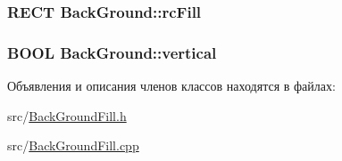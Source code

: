 \hypertarget{class_back_ground_ab617902b70204abeba1512a5a85c3114}{
\subsubsection[{rc\-Fill}]{\setlength{\rightskip}{0pt plus 5cm}R\-E\-C\-T Back\-Ground\-::rc\-Fill\hspace{0.3cm}{\ttfamily [protected]}}}\label{class_back_ground_ab617902b70204abeba1512a5a85c3114}
\hypertarget{class_back_ground_a60e91e14cfea358477466c03bc918514}{
\subsubsection[{vertical}]{\setlength{\rightskip}{0pt plus 5cm}B\-O\-O\-L Back\-Ground\-::vertical\hspace{0.3cm}{\ttfamily [protected]}}}\label{class_back_ground_a60e91e14cfea358477466c03bc918514}


Объявления и описания членов классов находятся в файлах\-:\begin{DoxyCompactItemize}
\item 
src/\hyperlink{_back_ground_fill_8h}{Back\-Ground\-Fill.\-h}\item 
src/\hyperlink{_back_ground_fill_8cpp}{Back\-Ground\-Fill.\-cpp}\end{DoxyCompactItemize}
